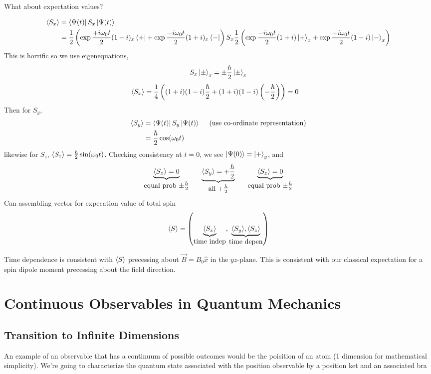 \documentclass[english, 11pt]{article}
\begin{document}
    What about expectation values?

    \begin{align*}
      \langle S_x \rangle & = \left\langle\Psi(t)\right|S_x\left|\Psi(t)\right\rangle \\
              & = \frac{1}{2} \left( \exp{\frac{+i\omega_0t}{2}} (1-i){}_x\left\langle+\right| + \exp{\frac{-i\omega_0t}{2}}(1+i){}_x\left\langle-\right| \right) S_x \frac{1}{2} \left( \exp{\frac{-i\omega_0t}{2}} (1+i)\left|+\right\rangle_x + \exp{\frac{+i\omega_0t}{2}}(1-i)\left|-\right\rangle_x \right)
    \end{align*}
    This is horrific so we use eigenequations,
    \[ S_x\left|\pm\right\rangle_x = \pm\frac{\hbar}{2}\left|\pm\right\rangle_x \]
    \begin{align*}
      \langle S_x \rangle & = \frac{1}{4} \left( (1+i)(1-i)\frac{\hbar}{2} + (1+i)(1-i)\left( -\frac{\hbar}{2} \right) \right) = 0
    \end{align*}
    Then for $S_y$,
    \begin{align*}
      \langle S_y \rangle & = \left\langle\Psi(t)\right|S_y\left|\Psi(t)\right\rangle \ \ \ \ \mbox{(use co-ordinate representation)} \\
              & = \frac{\hbar}{2}\cos(\omega_0t)
    \end{align*}
    likewise for $S_z$, $\langle S_z \rangle = \frac{\hbar}{2}\sin(\omega_0t)$. Checking consistency at $t = 0$, we see $\left|\Psi(0)\right\rangle = \left|+\right\rangle_y$, and
    \[ \underbrace{\E{S_x} = 0}_{\mbox{equal prob $\pm\f{\hbar}{2}$}} \ \ \ \ \ \underbrace{\E{S_y} = +\f{\hbar}{2}}_{\mbox{all $+\f{\hbar}{2}$}} \ \ \ \ \ \underbrace{\E{S_z} = 0}_{\mbox{equal prob $\pm\f{\hbar}{2}$}}\]
    Can assembling vector for expecation value of total spin
    \[ \langle S \rangle = \left( \underbrace{\langle S_x \rangle}_{\mbox{time indep}}, \underbrace{\langle S_y \rangle, \langle S_z \rangle}_{\mbox{time depen}} \right) \]

    Time dependence is consistent with $\langle S \rangle$ precessing about $\vec{B} = B_0\hat{x}$ in the $yz$-plane. This is consistent with our classical expectation for a spin dipole moment precessing about the field direction.

  \section{Continuous Observables in Quantum Mechanics}

    \subsection{Transition to Infinite Dimensions}

    An example of an observable that has a continuum of possible outcomes would be the poisition of an atom (1 dimension for mathematical simplicity). We're going to characterize the quantum state associated with the position observable by a position ket and an associated bra
\end{document}
